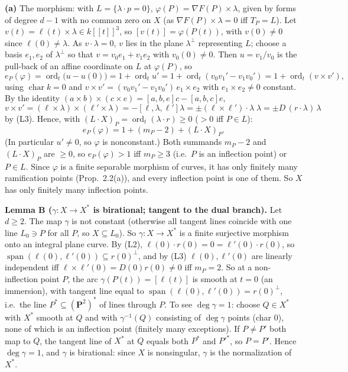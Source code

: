 \documentclass[11pt]{article}
\begin{document}
\textbf{(a)} The morphism: with $L=\{\lambda\cdot p=0\}$, $\varphi(P)=\nabla F(P)\times\lambda$, given by forms of degree $d-1$ with no common zero on $X$ (as $\nabla F(P)\times\lambda=0$ iff $T_P=L$). Let $v(t)=\ell(t)\times\lambda\in k[[t]]^3$, so $[v(t)]=\varphi(P(t))$, with $v(0)\ne0$ since $\ell(0)\ne\lambda$. As $v\cdot\lambda=0$, $v$ lies in the plane $\lambda^\perp$ representing $L$; choose a basis $e_1,e_2$ of $\lambda^\perp$ so that $v=v_0e_1+v_1e_2$ with $v_0(0)\ne0$. Then $u=v_1/v_0$ is the pull-back of an affine coordinate on $L$ at $\varphi(P)$, so
\[
e_P(\varphi)=\operatorname{ord}_t\bigl(u-u(0)\bigr)=1+\operatorname{ord}_tu'=1+\operatorname{ord}_t(v_0v_1'-v_1v_0')=1+\operatorname{ord}_t(v\times v'),
\]
using $\operatorname{char}k=0$ and $v\times v'=(v_0v_1'-v_1v_0')\,e_1\times e_2$ with $e_1\times e_2\ne0$ constant. By the identity $(a\times b)\times(c\times e)=[a,b,e]c-[a,b,c]e$,
\[
v\times v'=(\ell\times\lambda)\times(\ell'\times\lambda)=-[\ell,\lambda,\ell']\lambda=\pm(\ell\times\ell')\cdot\lambda\;\lambda=\pm D\,(r\cdot\lambda)\,\lambda
\]
by (L3). Hence, with $(L\cdot X)_P=\operatorname{ord}_t(\lambda\cdot r)\ge0$ ($>0$ iff $P\in L$):
\[
e_P(\varphi)=1+(m_P-2)+(L\cdot X)_P.\tag{$\ast$}
\]
(In particular $u'\neq0$, so $\varphi$ is nonconstant.) Both summands $m_P-2$ and $(L\cdot X)_P$ are $\ge0$, so $e_P(\varphi)>1$ iff $m_P\ge3$ (i.e.\ $P$ is an inflection point) or $P\in L$. Since $\varphi$ is a finite separable morphism of curves, it has only finitely many ramification points (Prop.~2.2(a)), and every inflection point is one of them. So $X$ has only finitely many inflection points.

\textbf{Lemma B ($\gamma:X\to X^*$ is birational; tangent to the dual branch).} Let $d\ge2$. The map $\gamma$ is not constant (otherwise all tangent lines coincide with one line $L_0\ni P$ for all $P$, so $X\subseteq L_0$). So $\gamma:X\to X^*$ is a finite surjective morphism onto an integral plane curve. By (L2), $\ell(0)\cdot r(0)=0=\ell'(0)\cdot r(0)$, so $\operatorname{span}(\ell(0),\ell'(0))\subseteq r(0)^\perp$, and by (L3) $\ell(0),\ell'(0)$ are linearly independent iff $\ell\times\ell'(0)=D(0)r(0)\ne0$ iff $m_P=2$. So at a non-inflection point $P$, the arc $\gamma(P(t))=[\ell(t)]$ is smooth at $t=0$ (an immersion), with tangent line equal to $\operatorname{span}(\ell(0),\ell'(0))=r(0)^\perp$, i.e.\ the line $P^*\subseteq(\mathbf P^2)^*$ of lines through $P$. To see $\deg\gamma=1$: choose $Q\in X^*$ with $X^*$ smooth at $Q$ and with $\gamma^{-1}(Q)$ consisting of $\deg\gamma$ points (char $0$), none of which is an inflection point (finitely many exceptions). If $P\ne P'$ both map to $Q$, the tangent line of $X^*$ at $Q$ equals both $P^*$ and $P'^*$, so $P=P'$. Hence $\deg\gamma=1$, and $\gamma$ is birational: since $X$ is nonsingular, $\gamma$ is the normalization of $X^*$.
\end{document}
